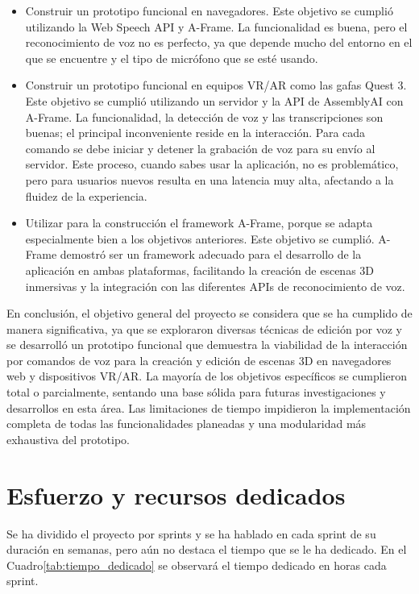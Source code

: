 \documentclass[a4paper, 12pt]{book}
\begin{document}
\begin{itemize}
  Sin embargo, la modularidad podría haberse profundizado aún más para facilitar futuras extensiones y el mantenimiento del código.
  \item Construir un prototipo funcional en navegadores.
  Este objetivo se cumplió utilizando la Web Speech API y A-Frame. La funcionalidad es buena, pero el reconocimiento de voz no es perfecto, ya que depende mucho del entorno en el que se encuentre y el tipo de micrófono que se esté usando.
  \item Construir un prototipo funcional en equipos VR/AR como las gafas Quest 3.
  Este objetivo se cumplió utilizando un servidor y la API de AssemblyAI con A-Frame. La funcionalidad, la detección de voz y las transcripciones son buenas; el principal inconveniente reside en la interacción. Para cada comando se debe iniciar y detener la grabación de voz para su envío al servidor. Este proceso, cuando sabes usar la aplicación, no es problemático, pero para usuarios nuevos resulta en una latencia muy alta, afectando a la fluidez de la experiencia.
  \item Utilizar para la construcción el framework A-Frame, porque se adapta especialmente bien a los objetivos anteriores. 
  Este objetivo se cumplió. A-Frame demostró ser un framework adecuado para el desarrollo de la aplicación en ambas plataformas, facilitando la creación de escenas 3D inmersivas y la integración con las diferentes APIs de reconocimiento de voz.

\end{itemize}

En conclusión, el objetivo general del proyecto se considera que se ha cumplido de manera significativa, ya que se exploraron diversas técnicas de edición por voz y se desarrolló un prototipo funcional que demuestra la viabilidad de la interacción por comandos de voz para la creación y edición de escenas 3D en navegadores web y dispositivos VR/AR. La mayoría de los objetivos específicos se cumplieron total o parcialmente, sentando una base sólida para futuras investigaciones y desarrollos en esta área. Las limitaciones de tiempo impidieron la implementación completa de todas las funcionalidades planeadas y una modularidad más exhaustiva del prototipo.

\section{Esfuerzo y recursos dedicados}
\label{sec:esfuerzo-recursos}

Se ha dividido el proyecto por sprints y se ha hablado en cada sprint de su duración en semanas, pero aún no destaca el tiempo que se le ha dedicado. En el Cuadro\ref{tab:tiempo_dedicado} se observará el tiempo dedicado en horas cada sprint.
\end{document}
